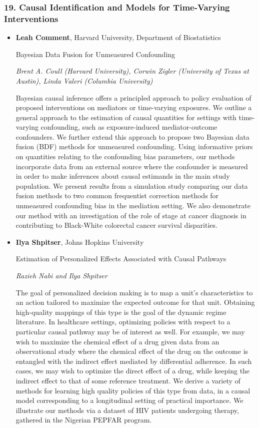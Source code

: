 \subsubsection*{19. Causal Identification and Models for Time-Varying Interventions}

\begin{itemize}
\item \textbf{Leah Comment}, Harvard University, Department of Biostatistics

Bayesian Data Fusion for Unmeasured Confounding

\emph{\footnotesize Brent A. Coull (Harvard University), Corwin Zigler (University of Texas at Austin), Linda Valeri (Columbia University)}

Bayesian causal inference offers a principled approach to policy evaluation of proposed interventions on mediators or time-varying exposures. We outline a general approach to the estimation of causal quantities for settings with time-varying confounding, such as exposure-induced mediator-outcome confounders. We further extend this approach to propose two Bayesian data fusion (BDF) methods for unmeasured confounding. Using informative priors on quantities relating to the confounding bias parameters, our methods incorporate data from an external source where the confounder is measured in order to make inferences about causal estimands in the main study population. We present results from a simulation study comparing our data fusion methods to two common frequentist correction methods for unmeasured confounding bias in the mediation setting. We also demonstrate our method with an investigation of the role of stage at cancer diagnosis in contributing to Black-White colorectal cancer survival disparities.

\item \textbf{Ilya Shpitser}, Johns Hopkins University

Estimation of Personalized Effects Associated with Causal Pathways

\emph{\footnotesize Razieh Nabi and Ilya Shpitser}

The goal of personalized decision making is to map a unit’s characteristics to an action tailored to maximize the expected outcome for that unit. Obtaining high-quality mappings of this type is the goal of the dynamic regime literature. In healthcare settings, optimizing policies with respect to a particular causal pathway may be of interest as well. For example, we may wish to maximize the chemical effect of a drug given data from an observational study where the chemical effect of the drug on the outcome is entangled with the indirect effect mediated by differential adherence. In such cases, we may wish to optimize the direct effect of a drug, while keeping the indirect effect to that of some reference treatment. We derive a variety of methods for learning high quality policies of this type from data, in a causal model corresponding to a longitudinal setting of practical importance. We illustrate our methods via a dataset of HIV patients undergoing therapy, gathered in the Nigerian PEPFAR program.



\end{itemize}
